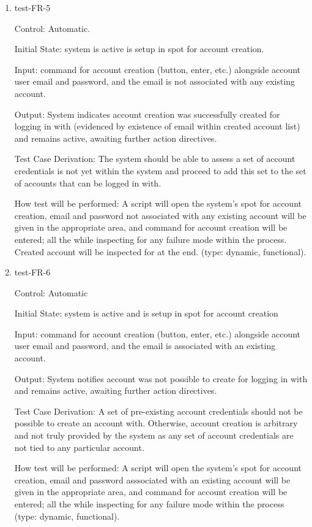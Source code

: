 \documentclass[12pt, titlepage]{article}
\begin{document}
\begin{enumerate}

\item{test-FR-5\\}

Control: Automatic.
					
Initial State: system is active is setup in spot for account creation.
					
Input: command for account creation (button, enter, etc.) alongside account 
user email and password, and the email is not associated with any existing 
account.
					
Output: System indicates account creation was successfully created for 
logging in with (evidenced by existence of email within created account list)
and remains active, awaiting further action directives.

Test Case Derivation: The system should be able to assess a set of account 
credentials is not yet within the system and proceed to add this set to the 
set of accounts that can be logged in with.

How test will be performed: A script will open the system's spot for account creation, 
email and password not associated with any existing account will be given in the 
appropriate area, and command for account creation will be entered; all the while inspecting 
for any failure mode within the process. Created account will be inspected for at the end.
(type: dynamic, functional).

\item{test-FR-6\\}

Control: Automatic
					
Initial State: system is active and is setup in spot for account creation
					
Input: command for account creation (button, enter, etc.) alongside account 
user email and password, and the email is associated with an existing 
account.
					
Output: System notifies account was not possible to create for logging 
in with and remains active, awaiting further action directives.

Test Case Derivation: A set of pre-existing account credentials should not be 
possible to create an account with. Otherwise, account creation is arbitrary 
and not truly provided by the system as any set of account credentials are not 
tied to any particular account.

How test will be performed: A script will open the system's spot for account 
creation, email and password asssociated with an existing account will be 
given in the appropriate area, and command for account creation will be 
entered; all the while inspecting for any failure mode within the process 
(type: dynamic, functional).
					

\end{enumerate}
\end{document}
